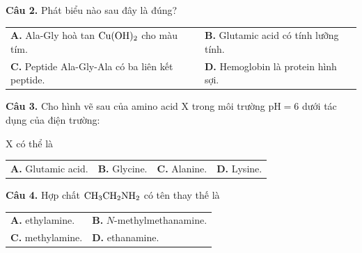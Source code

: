 \documentclass{article}
\begin{document}
\fontsize{25}{32}\selectfont
\textbf{Câu 2.} Phát biểu nào sau đây là đúng?
\vspace{4pt}

\begin{tabularx}{\linewidth}{@{}X X@{}}
\textbf{A.} Ala-Gly hoà tan $\ce{Cu(OH)2}$ cho màu tím. & \textbf{B.} Glutamic acid có tính lưỡng tính.\\[4pt]
\textbf{C.} Peptide Ala-Gly-Ala có ba liên kết peptide. & \textbf{D.} Hemoglobin là protein hình sợi.
\end{tabularx}

\vspace*{\fill}

\textbf{Câu 3.} Cho hình vẽ sau của amino acid X trong môi trường $\text{pH} = 6$ dưới tác dụng của điện trường:
\vspace{4pt}

\begin{center}
\end{center}
\vspace{2pt}
X có thể là
\vspace{4pt}

\begin{tabularx}{\linewidth}{@{}X X X X@{}}
\textbf{A.} Glutamic acid. & \textbf{B.} Glycine. & \textbf{C.} Alanine. & \textbf{D.} Lysine.
\end{tabularx}
\vspace*{\fill}
\newpage

\fontsize{28}{38}\selectfont
\textbf{Câu 4.} Hợp chất $\ce{CH3CH2NH2}$ có tên thay thế là
\vspace{6pt}

\begin{tabularx}{\linewidth}{@{}X X@{}}
\textbf{A.} ethylamine. & \textbf{B.} $N$-methylmethanamine.\\[6pt]
\textbf{C.} methylamine. & \textbf{D.} ethanamine.
\end{tabularx}
\end{document}
